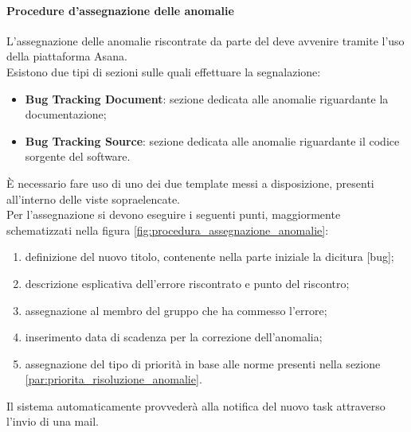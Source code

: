 			\paragraph{Procedure d'assegnazione delle anomalie}
			\label{par:Procedure_assegnazione_delle_anomalie}
			L'assegnazione delle anomalie riscontrate da parte del \roleVerifier{} deve avvenire tramite l'uso della piattaforma Asana.\\
			Esistono due tipi di sezioni sulle quali effettuare la segnalazione:
			\begin{itemize}
				\item \textbf{Bug Tracking Document}: sezione dedicata alle anomalie riguardante la documentazione;
				\item \textbf{Bug Tracking Source}: sezione dedicata alle anomalie riguardante il codice sorgente del software.
			\end{itemize}
			\noindent
			\`E necessario fare uso di uno dei due template messi a disposizione, presenti all'interno delle viste sopraelencate.\\
			Per l'assegnazione si devono eseguire i seguenti punti, maggiormente schematizzati nella figura \ref{fig:procedura_assegnazione_anomalie}:
			\begin{enumerate}
				\item definizione del nuovo titolo, contenente nella parte iniziale la dicitura {[}bug{]};
				\item descrizione esplicativa dell'errore riscontrato e punto del riscontro;
				\item assegnazione al membro del gruppo che ha commesso l'errore;
				\item inserimento data di scadenza per la correzione dell'anomalia;
				\item assegnazione del tipo di priorità in base alle norme presenti nella sezione \ref{par:priorita_risoluzione_anomalie}.
			\end{enumerate}
			\noindent
			Il sistema automaticamente provvederà alla notifica del nuovo task attraverso l'invio di una mail.
